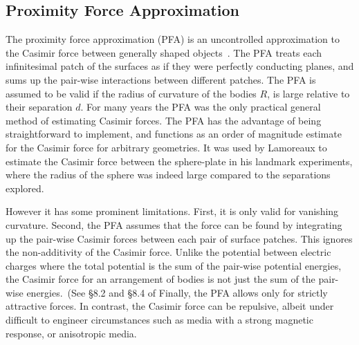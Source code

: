 
\subsection{Proximity Force Approximation}

The proximity force approximation (PFA) is an uncontrolled approximation to
the Casimir force between generally shaped objects~\cite{Derjaguin1956}.  
The PFA treats each infinitesimal patch of the surfaces as if they were perfectly conducting planes,
and sums up the pair-wise interactions between different patches.
The PFA is assumed to be valid if the radius of curvature of the bodies $R$, is large relative to 
their separation $d$.  
For many years the PFA was the only practical general method of estimating Casimir forces.
The PFA has the advantage of being straightforward to implement, and functions as an order of magnitude
estimate for the Casimir force for arbitrary geometries.
It was used by Lamoreaux to estimate the Casimir force between the sphere-plate
in his landmark experiments, where the radius of the sphere was indeed large compared to the separations explored. 

However it has some prominent limitations.
First, it is only valid for vanishing curvature.
Second, the PFA assumes that the force can be found by integrating up
the pair-wise Casimir forces between each pair of surface patches.  This ignores the non-additivity
of the Casimir force.  Unlike the potential between electric charges where the total potential is
the sum of the pair-wise potential energies, the Casimir force for an arrangement
of bodies is not just the sum of the pair-wise energies.~(See \S{8.2} and \S{8.4} of \cite{Milonni1994}
Finally, the PFA allows only for strictly attractive forces.  
In contrast, the Casimir force can be repulsive, albeit under difficult to engineer circumstances 
such as media with a strong magnetic response, or anisotropic media.

